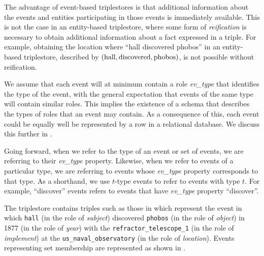 \documentclass[../main.tex]{subfiles}
\begin{document}
\begin{refsection}
The advantage of event-based triplestores is that additional information about the events and entities participating in those events is immediately available. This is not the case in an entity-based triplestore, where some form of \textit{reification} is necessary to obtain additional information about a fact expressed in a triple.  For example, obtaining the location where ``hall discovered phobos'' in an entity-based triplestore, described by $(\operatorname{hall}, \operatorname{discovered}, \operatorname{phobos})$, is not possible without reification.

We assume that each event will at minimum contain a role \textit{ev\_type} that identifies the type of the event, with the general expectation that events of the same type will contain similar roles.
This implies the existence of a schema that describes the types of roles that an event may contain.  As a consequence of this, each event could be equally well be represented by a row in a relational database.  We discuss this further in .

Going forward, when we refer to the type of an event or set of events, we are referring to their \textit{ev\_type} property.  Likewise, when we refer to events of a particular type, we are referring to events whose \textit{ev\_type} property corresponds to that type.  As a shorthand, we use $t$-type events to refer to events with type $t$.  For example, ``discover'' events refers to events that have \textit{ev\_type} property ``discover''.

The triplestore contains triples such as those in  which represent the event in which \texttt{hall} (in the role of \textit{subject}) discovered \texttt{phobos} (in the role of \textit{object}) in 1877 (in the role of \textit{year}) with the \texttt{refractor\_telescope\_1} (in the role of \textit{implement})  at the \texttt{us\_naval\_observatory} (in the role of \textit{location}).  Events representing set membership are represented as shown in .


\end{refsection}
\end{document}
